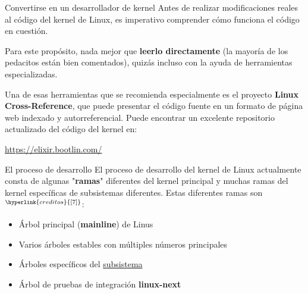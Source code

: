\begin{frame}[c]{Convertirse en un desarrollador de kernel}
  Antes de realizar modificaciones reales al código del kernel de Linux,
  es imperativo comprender cómo funciona el código en cuestión.

  \vspace{\baselineskip}
  Para este propósito, nada mejor que \textbf{leerlo directamente}
  (la mayoría de los pedacitos están bien comentados), quizás incluso con
  la ayuda de herramientas especializadas.

  \vspace{\baselineskip}
  Una de esas herramientas que se recomienda especialmente es el proyecto
  \textbf{Linux Cross-Reference}, que puede presentar el código fuente en
  un formato de página web indexado y autorreferencial. Puede encontrar
  un excelente repositorio actualizado del código del kernel en:

  \begin{exampleblock}{}
    \begin{center}
      \href{https://elixir.bootlin.com/}{https://elixir.bootlin.com/}
    \end{center}
  \end{exampleblock}
\end{frame}

\begin{frame}[c]{El proceso de desarrollo}
  El proceso de desarrollo del kernel de Linux actualmente consta de
  algunas "\textbf{ramas}" diferentes del kernel principal y muchas
  ramas del kernel específicas de subsistemas diferentes.
  Estas diferentes ramas son$^{\hyperlink{creditos}{[7]}}$:

  \vspace{\baselineskip}
  \begin{itemize}
    \item Árbol principal (\textbf{mainline}) de Linus
    \item Varios árboles estables con múltiples números principales
    \item Árboles específicos del \href{https://git.kernel.org/}{subsistema}
    \item Árbol de pruebas de integración \textbf{linux-next}
  \end{itemize}
\end{frame}


